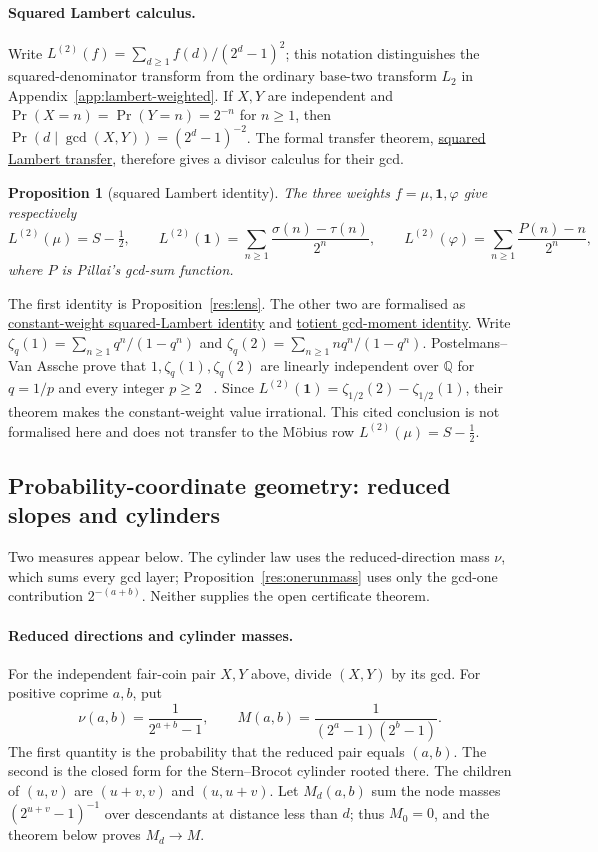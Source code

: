 \documentclass[11pt]{article}
\newcommand{\commit}{ebc98ee71f6819bd9fe344a0bb343542c604e533}
\newcommand{\repobase}{https://github.com/wcook04/plectis-lean-erdos249-257/blob/\commit}
\newcommand{\PK}{Erdos249257}
\newcommand{\lword}[4]{\href{\repobase/\PK/#1\#L#2}{#4}}
\newtheorem{proposition}[theorem]{Proposition}
\theoremstyle{definition}
\theoremstyle{remark}
\newcommand{\Q}{\mathbb{Q}}
\newcommand{\ph}{\varphi}
\begin{document}
{\paragraph{Squared Lambert calculus.}\label{sec:squared}
Write \(L^{(2)}(f)=\sum_{d\ge1}f(d)/(2^d-1)^2\); this notation distinguishes
the squared-denominator transform from the ordinary base-two transform $L_2$
in Appendix~\ref{app:lambert-weighted}.  If $X,Y$ are independent and
$\Pr(X=n)=\Pr(Y=n)=2^{-n}$ for $n\ge1$, then
$\Pr(d\mid\gcd(X,Y))=(2^d-1)^{-2}$.  The formal transfer theorem,
\lword{GcdMomentCalculus.lean}{105}{tsum_lambert_linear_weight_sq_pure}{squared Lambert transfer},
therefore gives a divisor calculus for their gcd.
\begin{proposition}[squared Lambert identity]\label{res:gcdmoment}
The three weights \(f=\mu,\mathbf 1,\ph\) give respectively
\[
 L^{(2)}(\mu)=S-\tfrac12,\qquad
 L^{(2)}(\mathbf 1)=\sum_{n\ge1}\frac{\sigma(n)-\tau(n)}{2^n},\qquad
 L^{(2)}(\ph)=\sum_{n\ge1}\frac{P(n)-n}{2^n},
\]
where \(P\) is Pillai's gcd-sum function.
\end{proposition}
\noindent The first identity is Proposition~\ref{res:lens}.  The other two are
formalised as \lword{GcdMomentCalculus.lean}{216}{tsum_one_div_mersenne_sq_eq_sigma_sub_tau_series}{constant-weight squared-Lambert identity} and
\lword{GcdMomentCalculus.lean}{235}{tsum_totient_div_mersenne_sq_eq_gcd_moment_series}{totient gcd-moment identity}.
Write
\(\zeta_q(1)=\sum_{n\ge1}q^n/(1-q^n)\) and
\(\zeta_q(2)=\sum_{n\ge1}nq^n/(1-q^n)\).
Postelmans--Van Assche prove that \(1,\zeta_q(1),\zeta_q(2)\) are linearly
independent over \(\Q\) for $q=1/p$ and every integer $p\ge2$
~\cite[Theorem~1.3]{postelmansvanassche}.  Since
$L^{(2)}(\mathbf1)=\zeta_{1/2}(2)-\zeta_{1/2}(1)$, their theorem makes the
constant-weight value irrational.  This cited conclusion is not formalised
here and does not transfer to the M\"obius row $L^{(2)}(\mu)=S-\tfrac12$.

\subsection{Probability-coordinate geometry: reduced slopes and cylinders}
\label{app:lambert-probability}

Two measures appear below.  The cylinder law uses the reduced-direction mass
$\nu$, which sums every gcd layer; Proposition~\ref{res:onerunmass} uses only
the gcd-one contribution $2^{-(a+b)}$.  Neither supplies the open certificate
theorem.

\paragraph{Reduced directions and cylinder masses.}
For the independent fair-coin pair $X,Y$ above, divide $(X,Y)$ by its gcd.
For positive coprime \(a,b\), put
\[
  \nu(a,b)=\frac1{2^{a+b}-1},
  \qquad
  M(a,b)=\frac1{(2^a-1)(2^b-1)}.
\]
The first quantity is the probability that the reduced pair equals $(a,b)$.
The second is the closed form for the Stern--Brocot cylinder rooted there.
The children of $(u,v)$ are $(u+v,v)$ and $(u,u+v)$.  Let $M_d(a,b)$ sum the
node masses $(2^{u+v}-1)^{-1}$ over descendants at distance less than $d$;
thus $M_0=0$, and the theorem below proves $M_d\to M$.

}
\end{document}
